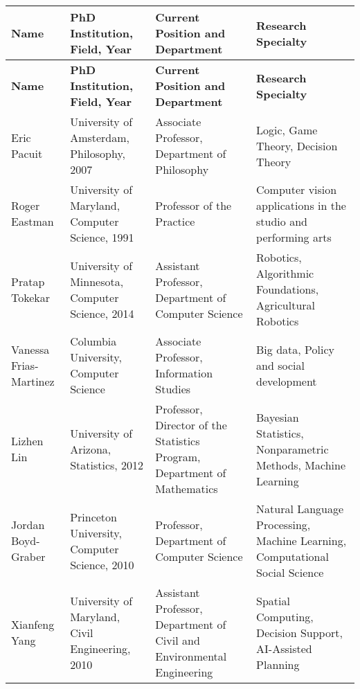 


\begin{longtable}{|>{\raggedright}p{2cm}|>{\raggedright}p{3cm}|>{\raggedright}p{4cm}|>{\raggedright}p{4cm}|}
\hline
\textbf{Name} & \textbf{PhD Institution, Field, Year} & \textbf{Current Position and Department} & \textbf{Research Specialty} \\
\hline
\endfirsthead
\hline
\textbf{Name} & \textbf{PhD Institution, Field, Year} & \textbf{Current Position and Department} & \textbf{Research Specialty} \\
\hline
\endhead
\hline
\endfoot
\hline
\endlastfoot
Eric Pacuit & University of Amsterdam, Philosophy, 2007 & Associate Professor, Department of Philosophy & Logic, Game Theory, Decision Theory \\
\hline
Roger Eastman & University of Maryland, Computer Science, 1991 & Professor of the Practice & Computer vision applications in the studio and performing arts \\
\hline
Pratap Tokekar & University of Minnesota, Computer Science, 2014 & Assistant Professor, Department of Computer Science & Robotics, Algorithmic Foundations, Agricultural Robotics \\
\hline
Vanessa Frias-Martinez & Columbia University, Computer Science & Associate Professor, Information Studies & Big data, Policy and social development \\
\hline
Lizhen Lin & University of Arizona, Statistics, 2012 & Professor, Director of the Statistics Program, Department of Mathematics & Bayesian Statistics, Nonparametric Methods, Machine Learning \\
\hline
Jordan Boyd-Graber & Princeton University, Computer Science, 2010 &  Professor, Department of Computer Science & Natural Language Processing, Machine Learning, Computational Social Science \\
\hline
Xianfeng Yang & University of Maryland, Civil Engineering, 2010 & Assistant Professor, Department of Civil and Environmental
Engineering & Spatial Computing, Decision Support, AI-Assisted Planning \\
\end{longtable}


